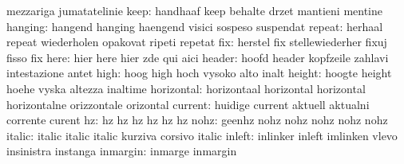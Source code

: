                            mezzariga                 jumatatelinie
                     keep: handhaaf                  keep
                           behalte                   drzet
                           mantieni                  mentine
                  hanging: hangend                   hanging
                           haengend                  visici
                           sospeso                   suspendat
                   repeat: herhaal                   repeat
                           wiederholen               opakovat
                           ripeti                    repetat
                      fix: herstel                   fix
                           stellewiederher           fixuj
                           fisso                     fix
                     here: hier                      here
                           hier                      zde
                           qui                       aici
                   header: hoofd                     header
                           kopfzeile                 zahlavi
                           intestazione              antet
                     high: hoog                      high
                           hoch                      vysoko
                           alto                      inalt
                   height: hoogte                    height
                           hoehe                     vyska
                           altezza                   inaltime
               horizontal: horizontaal               horizontal
                           horizontal                horizontalne
                           orizzontale               orizontal
                  current: huidige                   current
                           aktuell                   aktualni
                           corrente                  curent
                       hz: hz                        hz
                           hz                        hz
                           hz                        hz
                     nohz: geenhz                    nohz
                           nohz                      nohz
                           nohz                      nohz
                   italic: italic                    italic
                           italic                    kurziva
                           corsivo                   italic
                   inleft: inlinker                  inleft
                           imlinken                  vlevo
                           insinistra                instanga
                 inmargin: inmarge                   inmargin
